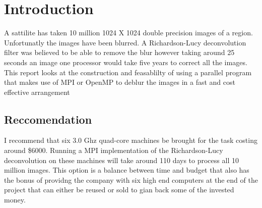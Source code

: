 \section{Introduction}

A sattilite has taken 10 million 1024 X 1024 double precision images of a region. Unfortunatly the images have been blurred. A Richardson-Lucy deconvolution filter was believed to be able to remove the blur however taking around 25 seconds an image one processor would take five years to correct all the images. This report looks at the construction and feasablilty of using a parallel program that makes use of MPI or OpenMP to deblur the images in a fast and cost effective arrangement

\subsection{Reccomendation}
I recommend that six 3.0 Ghz quad-core machines be brought for the task costing around \$6000. Running a MPI implementation of the Richardson-Lucy deconvolution on these machines will take around 110 days to process all 10 million images. This option is a balance between time and budget that also has the bonus of providng the company with six high end computers at the end of the project that can either be reused or sold to gian back some of the invested money.